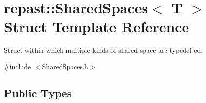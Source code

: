 \hypertarget{structrepast_1_1_shared_spaces}{\section{repast\-:\-:Shared\-Spaces$<$ T $>$ Struct Template Reference}
\label{structrepast_1_1_shared_spaces}
}


Struct within which multiple kinds of shared space are typedef-\/ed.  




{\ttfamily \#include $<$Shared\-Spaces.\-h$>$}

\subsection*{Public Types}
